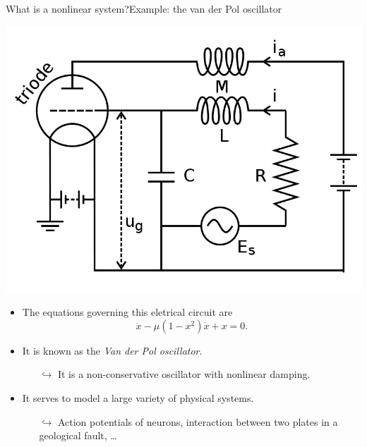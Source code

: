 \documentclass[usenames,dvipsnames,svgnames,10pt,aspectratio=169]{beamer}
\begin{document}
\begin{frame}[t, c]{What is a nonlinear system?}{Example: the van der Pol oscillator}
	\begin{minipage}{.38\textwidth}
		\centering
		\includegraphics[width=\textwidth]{van_der_pol}
	\end{minipage}%
	\hfill
	\begin{minipage}{.58\textwidth}
		\begin{itemize}
			\item The equations governing this eletrical circuit are
			\[
				\ddot{x} - \mu (1 - x^2) \dot{x} + x = 0.
			\]

			\medskip

			\item It is known as the \emph{Van der Pol oscillator}.
			\begin{itemize}
				\item[\( \hookrightarrow	\)] It is a non-conservative oscillator with nonlinear damping.
			\end{itemize}

			\bigskip

			\item It serves to model a large variety of physical systems.
			\begin{itemize}
				\item[\( \hookrightarrow \)] Action potentials of neurons, interaction between two plates in a geological fault, \ldots
			\end{itemize}
		\end{itemize}
	\end{minipage}

	\vspace{1cm}
\end{frame}
\end{document}
